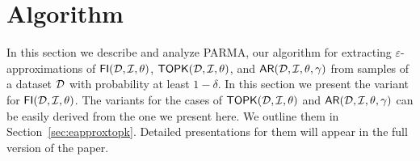 \section{Algorithm}
\label{sec:algo}
In this section we describe and analyze PARMA, our algorithm for extracting
$\varepsilon$-approximations of $\mathsf{FI}({\cal D},{\cal I},\theta)$,
$\mathsf{TOPK}({\cal D},{\cal I},\theta)$, and $\mathsf{AR}({\cal D},{\cal I},\theta,\gamma)$ from samples of a dataset
${\cal D}$ with probability at least $1-\delta$. In this section we present the
variant for $\mathsf{FI}({\cal D},{\cal I},\theta)$. The variants for the cases of $\mathsf{TOPK}({\cal D},{\cal I},\theta)$ and
$\mathsf{AR}({\cal D},{\cal I},\theta,\gamma)$ can be easily derived from the one
we present here. We outline them in Section~\ref{sec:eapproxtopk}. Detailed
presentations for them will appear in the full version of the paper.

